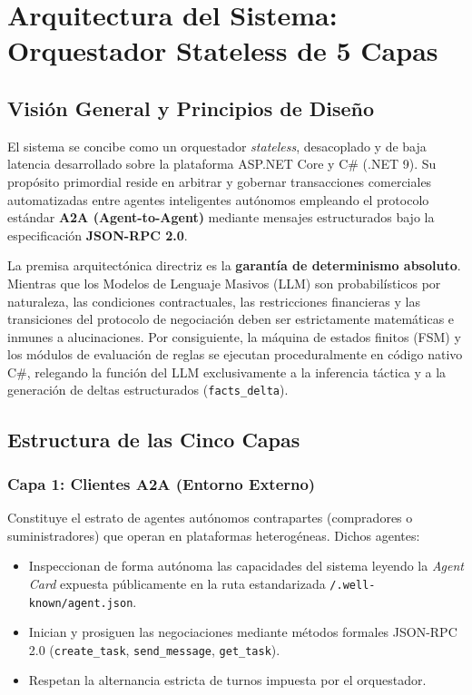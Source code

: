 \section{Arquitectura del Sistema: Orquestador Stateless de 5 Capas}
\label{sec:architecture}

\subsection{Visión General y Principios de Diseño}
El sistema se concibe como un orquestador \textit{stateless}, desacoplado y de baja latencia desarrollado sobre la plataforma ASP.NET Core y C\# (.NET 9). Su propósito primordial reside en arbitrar y gobernar transacciones comerciales automatizadas entre agentes inteligentes autónomos empleando el protocolo estándar \textbf{A2A (Agent-to-Agent)} mediante mensajes estructurados bajo la especificación \textbf{JSON-RPC 2.0}.

La premisa arquitectónica directriz es la \textbf{garantía de determinismo absoluto}. Mientras que los Modelos de Lenguaje Masivos (LLM) son probabilísticos por naturaleza, las condiciones contractuales, las restricciones financieras y las transiciones del protocolo de negociación deben ser estrictamente matemáticas e inmunes a alucinaciones. Por consiguiente, la máquina de estados finitos (FSM) y los módulos de evaluación de reglas se ejecutan proceduralmente en código nativo C\#, relegando la función del LLM exclusivamente a la inferencia táctica y a la generación de deltas estructurados (\texttt{facts\_delta}).

\subsection{Estructura de las Cinco Capas}

\subsubsection{Capa 1: Clientes A2A (Entorno Externo)}
Constituye el estrato de agentes autónomos contrapartes (compradores o suministradores) que operan en plataformas heterogéneas. Dichos agentes:
\begin{itemize}
    \item Inspeccionan de forma autónoma las capacidades del sistema leyendo la \textit{Agent Card} expuesta públicamente en la ruta estandarizada \texttt{/.well-known/agent.json}.
    \item Inician y prosiguen las negociaciones mediante métodos formales JSON-RPC 2.0 (\texttt{create\_task}, \texttt{send\_message}, \texttt{get\_task}).
    \item Respetan la alternancia estricta de turnos impuesta por el orquestador.
\end{itemize}


